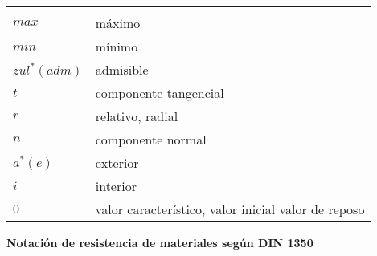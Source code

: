 \begin{mytable}[H]
	\centering
	\begin{tabular}{ll}
		\multicolumn{1}{c}{\quad\quad\quad} & \multicolumn{1}{c}{} \\
		$max$  \quad\quad\quad& máximo \\	
		$min$  & mínimo \\
		$zul^* (adm)$  & admisible \\
		$t$ &  componente tangencial \\
		$r$ & relativo, radial \\
		$n$ & componente normal \\
		$a^* (e)$ & exterior \\
		$i$ & interior \\
		$0$ & valor característico, valor inicial valor de reposo \\
	\end{tabular}
\end{mytable}



\begin{center}
	\textbf{Notación de resistencia de materiales según DIN 1350}
\end{center}

